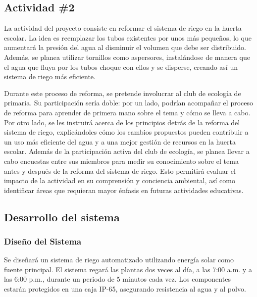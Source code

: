 \documentclass[12pt]{article}
\begin{document}
\subsection{Actividad \#2}
La actividad del proyecto consiste en reformar el sistema de riego en la huerta escolar. La idea es reemplazar los tubos existentes por unos más pequeños, lo que aumentará la presión del agua al disminuir el volumen que debe ser distribuido. Además, se planea utilizar tornillos como aspersores, instalándose de manera que el agua que fluya por los tubos choque con ellos y se disperse, creando así un sistema de riego más eficiente.

Durante este proceso de reforma, se pretende involucrar al club de ecología de primaria. Su participación sería doble: por un lado, podrían acompañar el proceso de reforma para aprender de primera mano sobre el tema y cómo se lleva a cabo. Por otro lado, se les instruirá acerca de los principios detrás de la reforma del sistema de riego, explicándoles cómo los cambios propuestos pueden contribuir a un uso más eficiente del agua y a una mejor gestión de recursos en la huerta escolar.
Además de la participación activa del club de ecología, se planea llevar a cabo encuestas entre sus miembros para medir su conocimiento sobre el tema antes y después de la reforma del sistema de riego. Esto permitirá evaluar el impacto de la actividad en su comprensión y conciencia ambiental, así como identificar áreas que requieran mayor énfasis en futuras actividades educativas.

\subsection{Desarrollo del sistema}
\subsubsection{Diseño del Sistema}
Se diseñará un sistema de riego automatizado utilizando energía solar como fuente principal. El sistema regará las plantas dos veces al día, a las 7:00 a.m. y a las 6:00 p.m., durante un periodo de 5 minutos cada vez. Los componentes estarán protegidos en una caja IP-65, asegurando resistencia al agua y al polvo.
\end{document}
